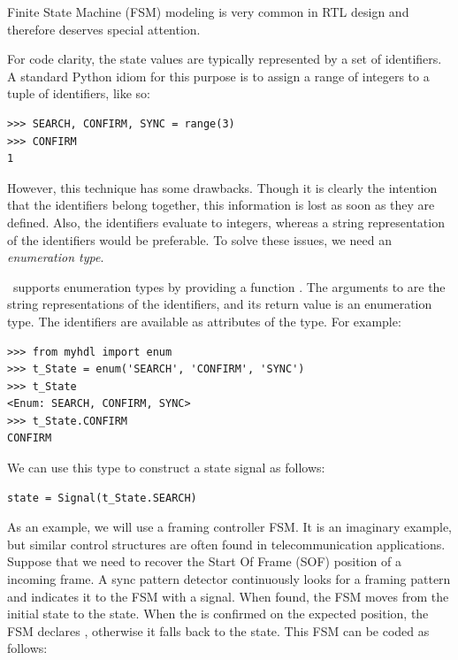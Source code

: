 Finite State Machine (FSM) modeling is very common in RTL
design and therefore deserves special attention.

For code clarity, the state values are typically represented by a set
of identifiers. A standard Python idiom for this purpose is to assign
a range of integers to a tuple of identifiers, like so:

\begin{verbatim}
>>> SEARCH, CONFIRM, SYNC = range(3)
>>> CONFIRM
1
\end{verbatim}

However, this technique has some drawbacks. Though it is clearly
the intention that the identifiers belong together, this information
is lost as soon as they are defined. Also, the identifiers evaluate to
integers, whereas a string representation of the identifiers
would be preferable. To solve these issues, we need an
\emph{enumeration type}.

\myhdl\ supports enumeration types by providing a function
.  The arguments to  are the string
representations of the identifiers, and its return value is an
enumeration type. The identifiers are available as attributes of the
type. For example:

\begin{verbatim}
>>> from myhdl import enum
>>> t_State = enum('SEARCH', 'CONFIRM', 'SYNC')
>>> t_State
<Enum: SEARCH, CONFIRM, SYNC>
>>> t_State.CONFIRM
CONFIRM
\end{verbatim}

We can use this type to construct a state signal as follows:

\begin{verbatim}
state = Signal(t_State.SEARCH)
\end{verbatim}

As an example, we will use a framing controller FSM.  It is an
imaginary example, but similar control structures are often found in
telecommunication applications. Suppose that we need to recover the
Start Of Frame (SOF) position of a incoming frame.
A sync pattern detector continuously looks for a framing
pattern and indicates it to the FSM with a  signal. When
found, the FSM moves from the initial  state to the
 state. When the 
is confirmed on the expected position, the FSM declares ,
otherwise it falls back to the  state.  This FSM can be
coded as follows:


